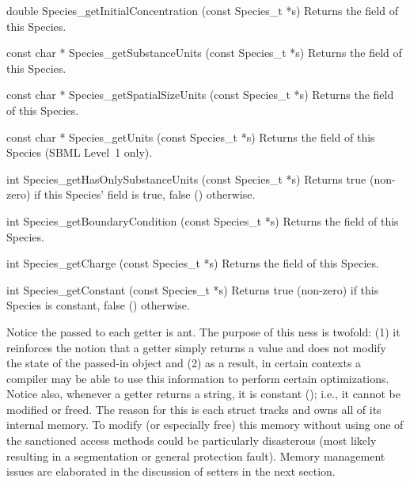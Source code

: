 \documentclass{sbmlmanual}
\begin{document}
\begin{methoddef}{double Species\_getInitialConcentration (const Species\_t *s)}
  Returns the  field of this Species.
\end{methoddef}


\begin{methoddef}{const char * Species\_getSubstanceUnits (const Species\_t *s)}
  Returns the  field of this Species.
\end{methoddef}


\begin{methoddef}{const char * Species\_getSpatialSizeUnits (const Species\_t *s)}
  Returns the  field of this Species.
\end{methoddef}


\begin{methoddef}{const char * Species\_getUnits (const Species\_t *s)}
  Returns the  field of this Species (SBML Level~1 only).
\end{methoddef}


\begin{methoddef}{int Species\_getHasOnlySubstanceUnits (const Species\_t *s)}
  Returns true (non-zero) if this Species' 
  field is true, false () otherwise.
\end{methoddef}


\begin{methoddef}{int Species\_getBoundaryCondition (const Species\_t *s)}
  Returns the  field of this Species.
\end{methoddef}


\begin{methoddef}{int Species\_getCharge (const Species\_t *s)}
  Returns the  field of this Species.
\end{methoddef}


\begin{methoddef}{int Species\_getConstant (const Species\_t *s)}
  Returns true (non-zero) if this Species is constant, false ()
  otherwise.
\end{methoddef}


Notice the  passed to each getter is ant.
The purpose of this ness is twofold: (1) it reinforces the
notion that a getter simply returns a value and does not modify the state
of the passed-in object and (2) as a result, in certain contexts a compiler
may be able to use this information to perform certain optimizations.
Notice also, whenever a getter returns a string, it is constant
(); i.e., it cannot be modified or freed.  The reason
for this is each struct tracks and owns all of its internal memory.  To
modify (or especially free) this memory without using one of the sanctioned
access methods could be particularly disasterous (most likely resulting in
a segmentation or general protection fault).  Memory management issues are
elaborated in the discussion of setters in the next section.
\end{document}
